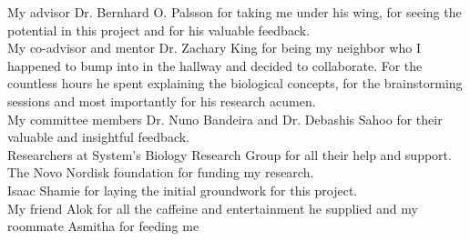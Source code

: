 \begin{frontmatter}
%
\tableofcontents
\listoffigures  %
\listoftables   %



%
%
\begin{acknowledgements}
 My advisor Dr. Bernhard O. Palsson for taking me under his wing, for seeing the potential in this project and for his valuable feedback.  \\
 My co-advisor and mentor Dr. Zachary King for being my neighbor who I happened to bump into in the hallway and decided to collaborate. For the countless hours he spent explaining the biological concepts, for the brainstorming sessions and most importantly for his research acumen.\\
 My committee members Dr. Nuno Bandeira and Dr. Debashis Sahoo for their valuable and insightful feedback.\\ 
 Researchers at System's Biology Research Group for all their help and support.\\
 The Novo Nordisk foundation for funding my research. \\
 Isaac Shamie for laying the initial groundwork for this project.\\
 My friend Alok for all the caffeine and entertainment he supplied and my roommate Asmitha for feeding me\\
 
\end{acknowledgements}


%
%



\end{frontmatter}
